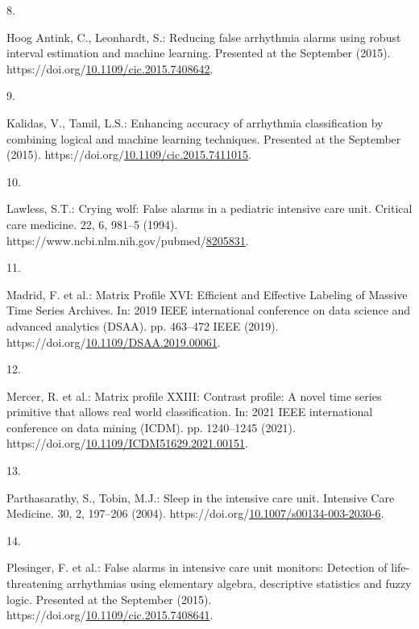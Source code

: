 \documentclass[runningheads]{llncs}
\newlength{\cslhangindent}
\newlength{\csllabelwidth}
\newenvironment{CSLReferences}[2] %
 {%
  \setlength{\parindent}{0pt}
  \ifodd #1 \everypar{\setlength{\hangindent}{\cslhangindent}}\ignorespaces\fi
  \ifnum #2 > 0
  \setlength{\parskip}{#2\baselineskip}
  \fi
 }%
 {}
\newcommand{\CSLLeftMargin}[1]{\parbox[t]{\csllabelwidth}{#1}}
\newcommand{\CSLRightInline}[1]{\parbox[t]{\linewidth - \csllabelwidth}{#1}\break}
\begin{document}
\begin{CSLReferences}{0}{0}
\leavevmode{}%
\CSLLeftMargin{8. }
\CSLRightInline{Hoog Antink, C., Leonhardt, S.: Reducing false arrhythmia alarms using robust interval estimation and machine learning. Presented at the September (2015). https://doi.org/\href{https://doi.org/10.1109/cic.2015.7408642}{10.1109/cic.2015.7408642}.}

\leavevmode{}%
\CSLLeftMargin{9. }
\CSLRightInline{Kalidas, V., Tamil, L.S.: Enhancing accuracy of arrhythmia classification by combining logical and machine learning techniques. Presented at the September (2015). https://doi.org/\href{https://doi.org/10.1109/cic.2015.7411015}{10.1109/cic.2015.7411015}.}

\leavevmode{}%
\CSLLeftMargin{10. }
\CSLRightInline{Lawless, S.T.: Crying wolf: False alarms in a pediatric intensive care unit. Critical care medicine. 22, 6, 981--5 (1994). https://www.ncbi.nlm.nih.gov/pubmed/\href{https://www.ncbi.nlm.nih.gov/pubmed/8205831}{8205831}.}

\leavevmode{}%
\CSLLeftMargin{11. }
\CSLRightInline{Madrid, F. et al.: {Matrix Profile XVI: Efficient and Effective Labeling of Massive Time Series Archives}. In: 2019 IEEE international conference on data science and advanced analytics (DSAA). pp. 463--472 IEEE (2019). https://doi.org/\href{https://doi.org/10.1109/DSAA.2019.00061}{10.1109/DSAA.2019.00061}.}

\leavevmode{}%
\CSLLeftMargin{12. }
\CSLRightInline{Mercer, R. et al.: Matrix profile XXIII: Contrast profile: A novel time series primitive that allows real world classification. In: 2021 IEEE international conference on data mining (ICDM). pp. 1240--1245 (2021). https://doi.org/\href{https://doi.org/10.1109/ICDM51629.2021.00151}{10.1109/ICDM51629.2021.00151}.}

\leavevmode{}%
\CSLLeftMargin{13. }
\CSLRightInline{Parthasarathy, S., Tobin, M.J.: Sleep in the intensive care unit. Intensive Care Medicine. 30, 2, 197--206 (2004). https://doi.org/\href{https://doi.org/10.1007/s00134-003-2030-6}{10.1007/s00134-003-2030-6}.}

\leavevmode{}%
\CSLLeftMargin{14. }
\CSLRightInline{Plesinger, F. et al.: False alarms in intensive care unit monitors: Detection of life-threatening arrhythmias using elementary algebra, descriptive statistics and fuzzy logic. Presented at the September (2015). https://doi.org/\href{https://doi.org/10.1109/cic.2015.7408641}{10.1109/cic.2015.7408641}.}


\end{CSLReferences}
\end{document}
